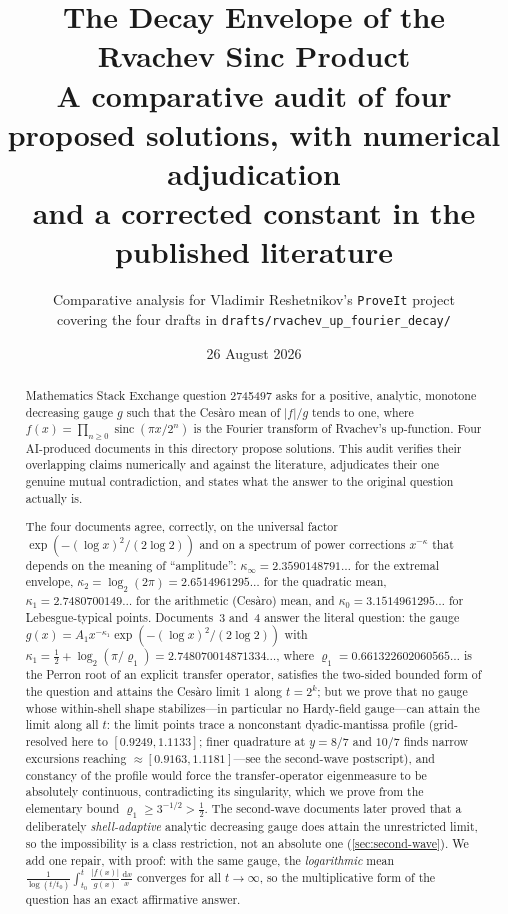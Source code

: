 \documentclass[11pt,oneside]{article}
\title{\bfseries The Decay Envelope of the Rvachev Sinc Product\\[0.35em]
\large A comparative audit of four proposed solutions, with numerical adjudication\\
and a corrected constant in the published literature}
\author{Comparative analysis for Vladimir Reshetnikov's \texttt{ProveIt} project\\
\small covering the four drafts in \nolinkurl{drafts/rvachev_up_fourier_decay/}}
\date{26 August 2026}
\theoremstyle{definition}
\theoremstyle{remark}
\newcommand{\sinc}{\operatorname{sinc}}
\newcommand{\dd}{\,\mathrm d}
\begin{document}
\maketitle

\begin{abstract}
Mathematics Stack Exchange question 2745497 asks for a positive, analytic,
monotone decreasing gauge $g$ such that the Ces\`aro mean of $|f|/g$ tends to
one, where $f(x)=\prod_{n\ge0}\sinc(\pi x/2^n)$ is the Fourier transform of
Rvachev's up-function.  Four AI-produced documents in this directory propose
solutions.  This audit verifies their overlapping claims numerically and
against the literature, adjudicates their one genuine mutual contradiction,
and states what the answer to the original question actually is.

The four documents agree, correctly, on the universal factor
$\exp(-(\log x)^2/(2\log2))$ and on a spectrum of power corrections
$x^{-\kappa}$ that depends on the meaning of ``amplitude'':
$\kappa_\infty=2.3590148791\ldots$ for the extremal envelope,
$\kappa_2=\log_2(2\pi)=2.6514961295\ldots$ for the quadratic mean,
$\kappa_1=2.7480700149\ldots$ for the arithmetic (Ces\`aro) mean, and
$\kappa_0=3.1514961295\ldots$ for Lebesgue-typical points.  Documents~3
and~4 answer the literal question: the gauge
$g(x)=A_1x^{-\kappa_1}\exp(-(\log x)^2/(2\log2))$ with
$\kappa_1=\tfrac12+\log_2(\pi/\varrho_1)=2.748070014871334\ldots$, where
$\varrho_1=0.661322602060565\ldots$ is the Perron root of an explicit
transfer operator, satisfies the two-sided bounded form of the question and
attains the Ces\`aro limit $1$ along $t=2^k$; but we prove that no gauge
whose within-shell shape stabilizes---in particular no Hardy-field
gauge---can attain the limit along all $t$: the limit
points trace a nonconstant dyadic-mantissa profile (grid-resolved here to
$[0.9249,1.1133]$; finer quadrature at $y=8/7$ and $10/7$ finds narrow
excursions reaching $\approx[0.9163,1.1181]$---see the second-wave
postscript), and constancy of the profile would force the
transfer-operator eigenmeasure to be absolutely continuous, contradicting
its singularity, which we prove from the elementary bound
$\varrho_1\ge3^{-1/2}>\tfrac12$.  The second-wave documents later proved
that a deliberately \emph{shell-adaptive} analytic decreasing gauge does
attain the unrestricted limit, so the impossibility is a class
restriction, not an absolute one (\cref{sec:second-wave}).  We add one repair, with proof: with the
same gauge, the \emph{logarithmic} mean
$\frac{1}{\log(t/t_0)}\int_{t_0}^t\frac{|f(x)|}{g(x)}\frac{\dd x}{x}$
converges for all $t\to\infty$, so the multiplicative form of the question
has an exact affirmative answer.


\end{abstract}
\end{document}

